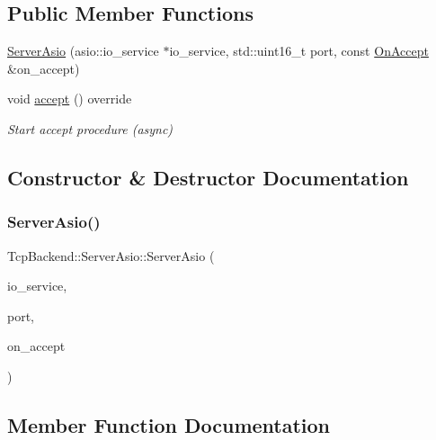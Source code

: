 \subsection*{Public Member Functions}
\begin{DoxyCompactItemize}
\item 
\hyperlink{classTcpBackend_1_1ServerAsio_ade8fcf1b5853bcde95a7ddcf40f6de12}{Server\+Asio} (asio\+::io\+\_\+service $\ast$io\+\_\+service, std\+::uint16\+\_\+t port, const \hyperlink{namespaceTcpBackend_a8aed04c0b1d33eb06aec746da4452484}{On\+Accept} \&on\+\_\+accept)
\item 
void \hyperlink{classTcpBackend_1_1ServerAsio_adc51e0fe964cfaf725d4c1b999dd36c1}{accept} () override
\begin{DoxyCompactList}\small\item\em Start accept procedure (async) \end{DoxyCompactList}\end{DoxyCompactItemize}


\subsection{Constructor \& Destructor Documentation}
\mbox{\label{classTcpBackend_1_1ServerAsio_ade8fcf1b5853bcde95a7ddcf40f6de12}} 
\subsubsection{\texorpdfstring{Server\+Asio()}{ServerAsio()}}
{\footnotesize\ttfamily Tcp\+Backend\+::\+Server\+Asio\+::\+Server\+Asio (\begin{DoxyParamCaption}\item[{asio\+::io\+\_\+service $\ast$}]{io\+\_\+service,  }\item[{std\+::uint16\+\_\+t}]{port,  }\item[{const \hyperlink{namespaceTcpBackend_a8aed04c0b1d33eb06aec746da4452484}{On\+Accept} \&}]{on\+\_\+accept }\end{DoxyParamCaption})}



\subsection{Member Function Documentation}
\mbox{\label{classTcpBackend_1_1ServerAsio_adc51e0fe964cfaf725d4c1b999dd36c1}} 
